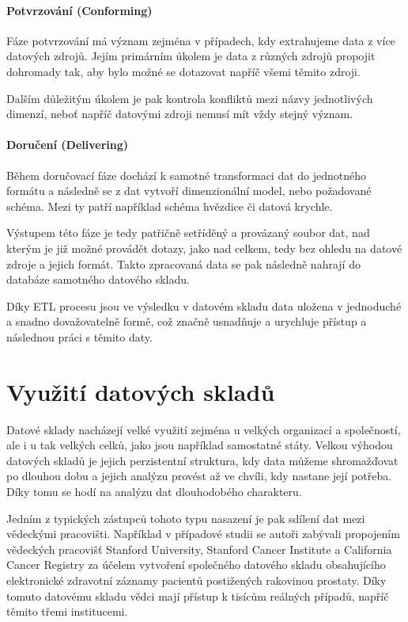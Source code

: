 \documentclass[
  digital,     %
  twoside,     %
  lof,         %
  lot,         %
]{fithesis4}
\begin{document}
\paragraph{Potvrzování (Conforming)}
Fáze potvrzování má význam zejména v případech, kdy extrahujeme data z více datových zdrojů. Jejím primárním úkolem je data z různých zdrojů propojit dohromady tak, aby bylo možné se dotazovat napříč všemi těmito zdroji. \parencite[s.~19]{Kimballc2004}

Dalším důležitým úkolem je pak kontrola konfliktů mezi názvy jednotlivých dimenzí, neboť napříč datovými zdroji nemusí mít vždy stejný význam. \parencite{Kimballc2004}

\paragraph{Doručení (Delivering)}
Během doručovací fáze dochází k samotné transformaci dat do jednotného formátu a následně se z dat vytvoří dimenzionální model, nebo požadované schéma. Mezi ty patří například schéma hvězdice či datová krychle.\parencite[s.~19]{Kimballc2004}

Výstupem této fáze je tedy patřičně setříděný a provázaný soubor dat, nad kterým je již možné provádět dotazy, jako nad celkem, tedy bez ohledu na datové zdroje a jejich formát. Takto zpracovaná data se pak následně nahrají do databáze samotného datového skladu.

Díky ETL procesu jsou ve výsledku v datovém skladu data uložena v jednoduché a snadno dovažovatelně formě, což značně usnadňuje a urychluje přístup a následnou práci s těmito daty.

\section{Využití datových skladů}
Datové sklady nacházejí velké využití zejména u velkých organizací a společností, ale i u tak velkých celků, jako jsou například samostatné státy. Velkou výhodou datových skladů je jejich perzistentní struktura, kdy data můžeme shromažďovat po dlouhou dobu a jejich analýzu provést až ve chvíli, kdy nastane její potřeba. Díky tomu se hodí na analýzu dat dlouhodobého charakteru.

Jedním z typických zástupců tohoto typu nasazení je pak sdílení dat mezi vědeckými pracovišti. Například v případové studii  \parencite{Seneviratne20180124} se autoři zabývali propojením vědeckých pracovišť Stanford University, Stanford Cancer Institute a California Cancer Registry za účelem vytvoření společného datového skladu obsahujícího elektronické zdravotní záznamy pacientů postižených rakovinou prostaty. Díky tomuto datovému skladu vědci mají přístup k tisícům reálných případů, napříč těmito třemi institucemi.
\end{document}
